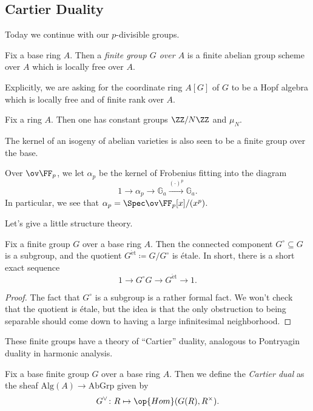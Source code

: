 \documentclass[../notes.tex]{subfiles}
\begin{document}
\subsection{Cartier Duality}
Today we continue with our $p$-divisible groups.
\begin{definition}
	Fix a base ring $A$. Then a \textit{finite group $G$ over $A$} is a finite abelian group scheme over $A$ which is locally free over $A$.
\end{definition}
\begin{remark}
	Explicitly, we are asking for the coordinate ring $A[G]$ of $G$ to be a Hopf algebra which is locally free and of finite rank over $A$.
\end{remark}
\begin{example}
	Fix a ring $A$. Then one has constant groups ${\ZZ/N\ZZ}$ and ${\mu_N}$.
\end{example}
\begin{example}
	The kernel of an isogeny of abelian varieties is also seen to be a finite group over the base.
\end{example}
\begin{example}
	Over $\ov\FF_p$, we let $\alpha_p$ be the kernel of Frobenius fitting into the diagram
	\[1\to\alpha_p\to\mathbb G_a\stackrel{(\cdot)^p}\to\mathbb G_a.\]
	In particular, we see that $\alpha_p=\Spec\ov\FF_p[x]/(x^p)$.
\end{example}
Let's give a little structure theory.
\begin{lemma} \label{lem:conn-et-sequence}
	Fix a finite group $G$ over a base ring $A$. Then the connected component $G^\circ\subseteq G$ is a subgroup, and the quotient $G^{\mathrm{\acute et}}\coloneqq G/G^\circ$ is \'etale. In short, there is a short exact sequence
	\[1\to G^\circ G\to G^{\mathrm{\acute et}}\to1.\]
\end{lemma}
\begin{proof}
	The fact that $G^\circ$ is a subgroup is a rather formal fact. We won't check that the quotient is \'etale, but the idea is that the only obstruction to being separable should come down to having a large infinitesimal neighborhood.
\end{proof}
These finite groups have a theory of ``Cartier'' duality, analogous to Pontryagin duality in harmonic analysis.
\begin{definition}
	Fix a base finite group $G$ over a base ring $A$. Then we define the \textit{Cartier dual} as the sheaf $\mathrm{Alg}(A)\to\mathrm{AbGrp}$ given by
	\[G^\lor\colon R\mapsto\op{Hom}(G(R),R^\times).\]
\end{definition}
\end{document}
